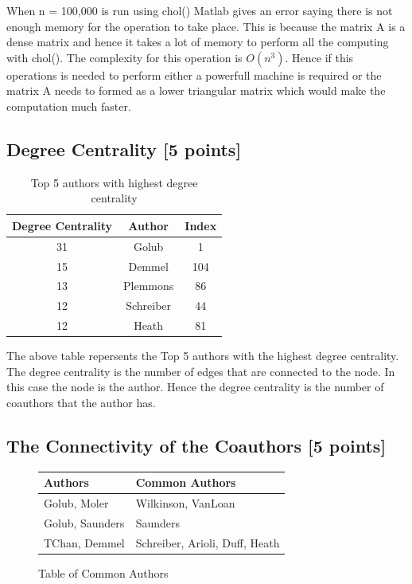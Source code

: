 \documentclass[unicode,11pt,a4paper,oneside,numbers=endperiod,openany]{scrartcl}
\begin{document}
When n = 100,000 is run using chol() Matlab gives an error saying there is not enough memory for the operation to take place. This is because the matrix A is a dense matrix and hence it takes a lot of memory to perform all the computing with chol(). The complexity for this operation is $O(n^3)$. Hence if this operations is needed to perform either a powerfull machine is required or the matrix A needs to formed as a lower triangular matrix which would make the computation much faster. \\

\subsection{Degree Centrality [5 points]}
\noindent
\begin{table}[H]
    \centering
    \begin{tabular}{|c|c|c|}
        \hline
        Degree Centrality & Author    & Index \\
        \hline
        31                & Golub     & 1     \\
        \hline
        15                & Demmel    & 104   \\
        \hline
        13                & Plemmons  & 86    \\
        \hline
        12                & Schreiber & 44    \\
        \hline
        12                & Heath     & 81    \\
        \hline
    \end{tabular}
    \caption{Top 5 authors with highest degree centrality}
\end{table}

The above table repersents the Top 5 authors with the highest degree centrality. The degree centrality is the number of edges that are connected to the node. In this case the node is the author. Hence the degree centrality is the number of coauthors that the author has. \\

\subsection{The Connectivity of the Coauthors [5 points]}

\begin{figure}[H]
    \centering
    \begin{tabular}{|l|l|}
        \hline
        Authors & Common Authors \\
        \hline
        Golub, Moler & Wilkinson, VanLoan \\
        Golub, Saunders & Saunders \\
        TChan, Demmel & Schreiber, Arioli, Duff, Heath \\
        \hline
    \end{tabular}
    \caption{Table of Common Authors}
\end{figure}
\end{document}
